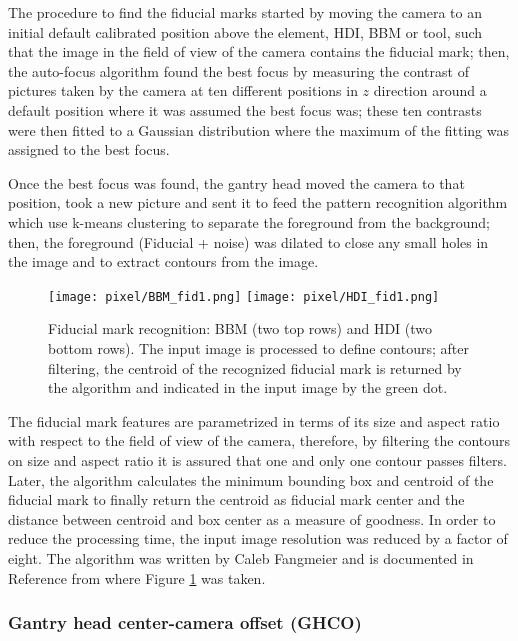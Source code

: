 The procedure to find the fiducial marks started by moving the camera to an initial default calibrated position above the element, HDI, BBM or tool, such that the image in the field of view of the camera contains the fiducial mark; then, the auto-focus algorithm found the best focus by measuring the contrast of pictures taken by the camera at ten different positions in $z$ direction around a default position where it was assumed the best focus was; these ten contrasts were then fitted to a Gaussian distribution where the maximum of the fitting was assigned to the best focus.     

Once the best focus was found, the gantry head moved the camera to that position, took a new picture and sent it to feed the pattern recognition algorithm which use k-means clustering to separate the foreground from the background; then, the foreground (Fiducial + noise) was dilated to close any small holes in the image and to extract contours from the image.

\begin{figure}[!ht]
  \centering  
  \texttt{[image: pixel/BBM\_fid1.png]}
  \texttt{[image: pixel/HDI\_fid1.png]}
  \caption[Fiducial mark recognition.]{Fiducial mark recognition: BBM (two top rows) and HDI (two bottom rows). The input image is processed to define contours; after filtering, the centroid of the recognized fiducial mark is returned by the algorithm and indicated in the input image by the green dot.}\label{fig:BBM_fid1}
\end{figure}

The fiducial mark features are parametrized in terms of its size and aspect ratio with respect to the field of view of the camera, therefore, by filtering the contours on size and aspect ratio it is assured that one and only one contour passes filters. Later, the algorithm calculates the minimum bounding box and centroid of the fiducial mark to finally return the centroid as fiducial mark center and the distance between centroid and box center as a measure of goodness. In order to reduce the processing time, the input image resolution was reduced by a factor of eight. The algorithm was written by Caleb Fangmeier and is documented in Reference \cite{pr_algorithm} from where Figure \ref{fig:BBM_fid1} was taken.

\subsubsection*{Gantry head center-camera offset (GHCO)}

